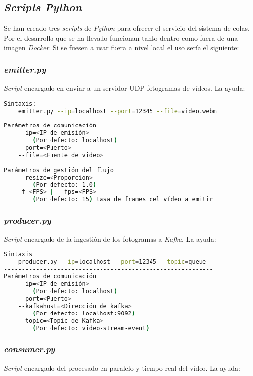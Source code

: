 \subsection{\textit{Scripts Python} }
Se han creado tres \textit{scripts} de \textit{Python} para ofrecer el servicio del sistema de colas. Por el desarrollo que se ha llevado funcionan tanto dentro como fuera de una imagen \textit{Docker}. Si se fuesen a usar fuera a nivel local el uso sería el siguiente:

\subsubsection{\textit{emitter.py}}
\textit{Script} encargado en enviar a un servidor UDP fotogramas de vídeos. La ayuda:

\begin{lstlisting}[language=Bash]
Sintaxis:
	emitter.py --ip=localhost --port=12345 --file=video.webm
-----------------------------------------------------------
Parámetros de comunicación
	--ip=<IP de emisión> 
		(Por defecto: localhost)
	--port=<Puerto>
	--file=<Fuente de video>
	
Parámetros de gestión del flujo
    --resize=<Proporcion> 
    	(Por defecto: 1.0)
    -f <FPS> | --fps=<FPS> 
    	(Por defecto: 15) tasa de frames del vídeo a emitir
\end{lstlisting}

\subsubsection{\textit{producer.py}}
\textit{Script} encargado de la ingestión de los fotogramas a \textit{Kafka}. La ayuda:

\begin{lstlisting}[language=Bash]
Sintaxis
	producer.py --ip=localhost --port=12345 --topic=queue 
-----------------------------------------------------------
Parámetros de comunicación
	--ip=<IP de emisión> 
		(Por defecto: localhost)
	--port=<Puerto>
	--kafkahost=<Dirección de kafka> 
		(Por defecto: localhost:9092)
	--topic=<Topic de Kafka> 
		(Por defecto: video-stream-event)
\end{lstlisting}

\subsubsection{\textit{consumer.py}}
\textit{Script} encargado del procesado en paralelo y tiempo real del vídeo. La ayuda:

